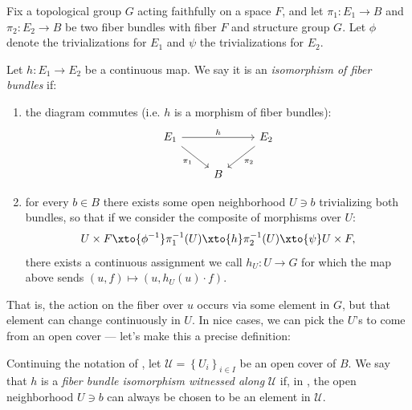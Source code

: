 \documentclass[11pt]{book}
\begin{document}
\begin{definition}\label{def:isomorphism-of-fiber-bundles} 
Fix a topological group $G$ acting faithfully on a space $F$, and let $\pi_1 \colon E_1 \to B$ and $\pi_2 \colon E_2 \to B$ be two fiber bundles with fiber $F$ and structure group $G$. Let $\phi$ denote the trivializations for $E_1$ and $\psi$ the trivializations for $E_2$.

Let $h \colon E_1 \to E_2$ be a continuous map. We say it is an \emph{isomorphism of fiber bundles} if:
\begin{enumerate}
    \item the diagram commutes (i.e. $h$ is a morphism of fiber bundles):
\[ \begin{tikzcd}
    E_1\ar[rr,"h" above]\ar[dr,"\pi_1" below left]&  & E_2\ar[dl,"\pi_2" below right]\\
     & B & 
\end{tikzcd} \]
    \item for every $b\in B$ there exists some open neighborhood $U \ni b$ trivializing both bundles, so that if we consider the composite of morphisms over $U$:
    \begin{equation}\label{eqn:hU-fiber-bundle-morphism}
    \begin{aligned}
        U \times F \xto{\phi^{-1}} \pi_1^{-1}(U) \xto{h} \pi_2^{-1}(U) \xto{\psi} U \times F,
    \end{aligned}
    \end{equation}
    there exists a continuous assignment we call $h_U \colon U \to G$ for which the map above sends $(u,f) \mapsto (u, h_U(u)\cdot f)$.
\end{enumerate}
\end{definition}

That is, the action on the fiber over $u$ occurs via some element in $G$, but that element can change continuously in $U$. In nice cases, we can pick the $U$'s to come from an open cover --- let's make this a precise definition:
\begin{definition}\label{def:iso-fiber-bundle-witnessed-along-cover} Continuing the notation of , let $\mathcal{U} = \left\{ U_i \right\}_{i\in I}$ be an open cover of $B$. We say that $h$ is a \emph{fiber bundle isomorphism witnessed along} $\mathcal{U}$ if, in , the open neighborhood $U\ni b$ can always be chosen to be an element in $\mathcal{U}$.
\end{definition}
\end{document}
